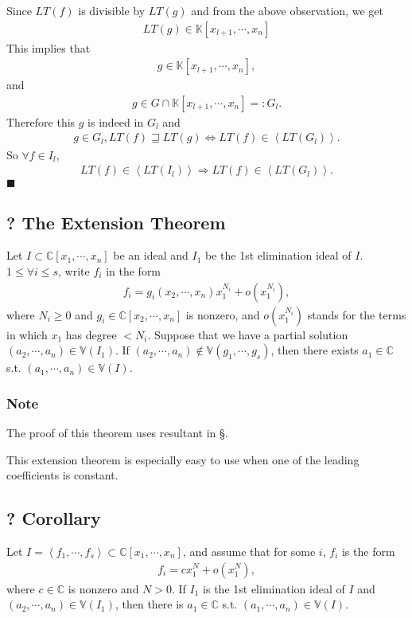 \documentclass[11pt]{book}
\begin{document}
Since $LT(f)$ is divisible by $LT(g)$ and from the above observation, we get
\begin{eqnarray}
LT(g) \in \mathbb{K}[x_{l+1}, \cdots, x_n]
\end{eqnarray}
This implies that
\begin{eqnarray}
g \in \mathbb{K}[x_{l+1}, \cdots, x_n],
\end{eqnarray}
and
\begin{eqnarray}
g \in G \cap \mathbb{K}[x_{l+1}, \cdots, x_n] =: G_l.
\end{eqnarray}
Therefore this $g$ is indeed in $G_l$ and
\begin{eqnarray}
g \in G_l, LT(f) \sqsupseteq LT(g) \Leftrightarrow LT(f) \in \left< LT(G_l) \right>.
\end{eqnarray}
So $\forall f \in I_l$,
\begin{eqnarray}
LT(f) \in \left< LT(I_l) \right> \Rightarrow LT(f) \in \left< LT(G_l) \right>.
\end{eqnarray}
$\blacksquare$

\subsection{? The Extension Theorem}
Let $I \subset \mathbb{C}[x_1, \cdots, x_n]$ be an ideal and $I_1$ be the 1st elimination ideal of $I$.
$1 \leq \forall i \leq s$, write $f_i$ in the form
\begin{eqnarray}
f_i = g_i(x_2, \cdots, x_n)x_1^{N_i} + o(x_1^{N_i}),
\end{eqnarray}
where $N_i \geq 0$ and $g_i \in \mathbb{C}[x_2, \cdots, x_n]$ is nonzero, and $o(x_1^{N_i})$ stands for the terms in which $x_1$ has degree $< N_i$.
Suppose that we have a partial solution $(a_2, \cdots, a_n) \in \mathbb{V}(I_1)$.
If $(a_2, \cdots, a_n) \notin \mathbb{V}(g_1, \cdots, g_s)$, then there exists $a_1 \in \mathbb{C}$ s.t. $(a_1, \cdots, a_n) \in \mathbb{V}(I)$.

\subsubsection{Note}
The proof of this theorem uses resultant in \S.

This extension theorem is especially easy to use when one of the leading coefficients is constant.

\subsection{? Corollary}
Let $I = \left< f_1, \cdots, f_s \right> \subset \mathbb{C}[x_1, \cdots, x_n]$, and assume that for some $i$, $f_i$ is the form
\begin{eqnarray}
f_i = c x_1^N + o(x_1^N),
\end{eqnarray}
where $c \in \mathbb{C}$ is nonzero and $N>0$.
If $I_1$ is the 1st elimination ideal of $I$ and $(a_2, \cdots, a_n) \in \mathbb{V}(I_1)$, then there is $a_1 \in \mathbb{C}$ s.t. $(a_1, \cdots, a_n) \in \mathbb{V}(I)$.
\end{document}
